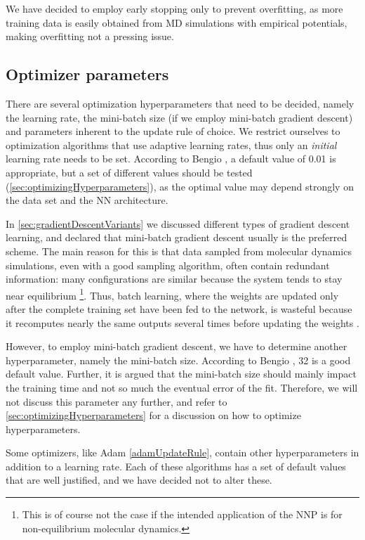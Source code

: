 \documentclass[twoside,english]{uiofysmaster}
\begin{document}
We have decided to employ early stopping only to prevent overfitting, as more training data is easily obtained from MD 
simulations with empirical potentials, making overfitting not a pressing issue. 


\subsection{Optimizer parameters}
There are several optimization hyperparameters that need to be decided, namely the learning rate, the mini-batch size
(if we employ mini-batch gradient descent) and parameters inherent to the update rule of choice. 
We restrict ourselves to optimization algorithms that use adaptive learning rates, thus only an \textit{initial}
learning rate needs to be set. According to Bengio \cite{Bengio12}, a default value of 0.01 is appropriate, but 
a set of different values should be tested (\autoref{sec:optimizingHyperparameters}), 
as the optimal value may depend strongly on the data set and the NN architecture. 

In \autoref{sec:gradientDescentVariants} we discussed different types of gradient descent learning, and 
declared that mini-batch gradient descent usually is the preferred scheme. The main reason for this is that data sampled from molecular 
dynamics simulations, even with a good sampling algorithm, often contain redundant information: many configurations 
are similar because the system tends to stay near equilibrium%
\footnote{This is of course not the case if the intended
application of the NNP is for non-equilibrium molecular dynamics.}. Thus, batch learning, where the weights are updated 
only after the complete training set have been fed to the network, is wasteful because it recomputes nearly the same outputs
several times before updating the weights \cite{LeCun99}. 

However, to employ mini-batch gradient descent, we have to determine another 
hyperparameter, namely the mini-batch size. According to Bengio \cite{Bengio12}, 32 is a good default value. Further, it is argued 
that the mini-batch size should mainly impact the training time and not so much the eventual error of the fit.
Therefore, we will not discuss this parameter any further, and refer to \autoref{sec:optimizingHyperparameters} for a discussion
on how to optimize hyperparameters.

Some optimizers, like Adam \eqref{adamUpdateRule}, contain other hyperparameters in addition to a learning rate.  
Each of these algorithms has a set of default values that are well justified, and we have decided not to alter these. 
\end{document}
